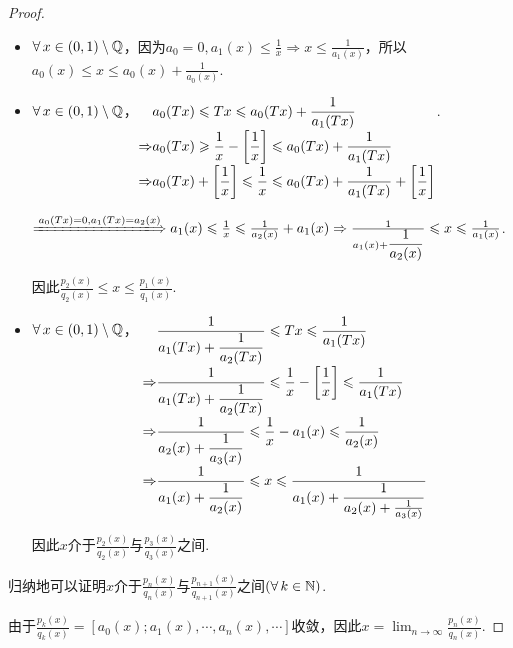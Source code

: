 \begin{proof}
    \begin{itemize}
        \item $\forall\, x\in (0,1)\setminus\mathbb{Q}$，因为$a_0=0,a_1(x)\leq\frac{1}{x}\Rightarrow x\leq\frac{1}{a_1(x)}$，所以$a_0(x)\leq x\leq a_0(x)+\frac{1}{a_0(x)}$.
        \item $\forall\, x\in(0,1)\setminus\mathbb{Q}$，$\setjot\begin{aligned}[t]
            &a_0(Tx) \leq Tx\leq a_0(Tx)+\frac{1}{a_1(Tx)} \\
            \Rightarrow& a_0(Tx)\geq\frac{1}{x}-\left[\frac{1}{x}\right]\leq a_0(Tx)+\frac{1}{a_1(Tx)} \\
            \Rightarrow& a_0(Tx)+\left[\frac{1}{x}\right]\leq\frac{1}{x}\leq a_0(Tx)+\frac{1}{a_1(Tx)}+\left[\frac{1}{x}\right]
        \end{aligned}$.\par
        $\xLongrightarrow{a_0(Tx)=0,a_1(Tx)=a_2(x)}a_1(x)\leq\frac{1}{x}\leq\frac{1}{a_2(x)}+a_1(x)\Rightarrow \frac{1}{a_1(x)+\dfrac{1}{a_2(x)}}\leq x\leq \frac{1}{a_1(x)}$.\par
        因此$\frac{p_2(x)}{q_2(x)}\leq x\leq \frac{p_1(x)}{q_1(x)}$.
        \item $\forall\, x\in(0,1)\setminus\mathbb{Q}$， $\setjot\begin{aligned}[t]&\frac{1}{a_1(Tx)+\dfrac{1}{a_2(Tx)}}\leq Tx\leq\frac{1}{a_1(Tx)} \\
        \Rightarrow& \frac{1}{a_1(Tx)+\dfrac{1}{a_2(Tx)}}\leq \frac{1}{x}-\left[\frac{1}{x}\right]\leq \frac{1}{a_1(Tx)} \\
        \Rightarrow& \frac{1}{a_2(x)+\dfrac{1}{a_3(x)}}\leq\frac{1}{x}-a_1(x)\leq\frac{1}{a_2(x)} \\
        \Rightarrow& \frac{1}{a_1(x)+\dfrac{1}{a_2(x)}}\leq x\leq \frac{1}{a_1(x)+\dfrac{1}{a_2(x)+\frac{1}{a_3(x)}}}
        \end{aligned}$\par
        因此$x$介于$\frac{p_2(x)}{q_2(x)}$与$\frac{p_3(x)}{q_3(x)}$之间.
    \end{itemize}\par
    归纳地可以证明$x$介于$\frac{p_n(x)}{q_n(x)}$与$\frac{p_{n+1}(x)}{q_{n+1}(x)}$之间$(\forall\, k\in\mathbb{N})$.\par
    由于$\frac{p_k(x)}{q_k(x)}=[a_0(x);a_1(x),\cdots,a_n(x),\cdots]$收敛，因此$x=\lim_{n\to\infty}\frac{p_n(x)}{q_n(x)}$.
\end{proof}

